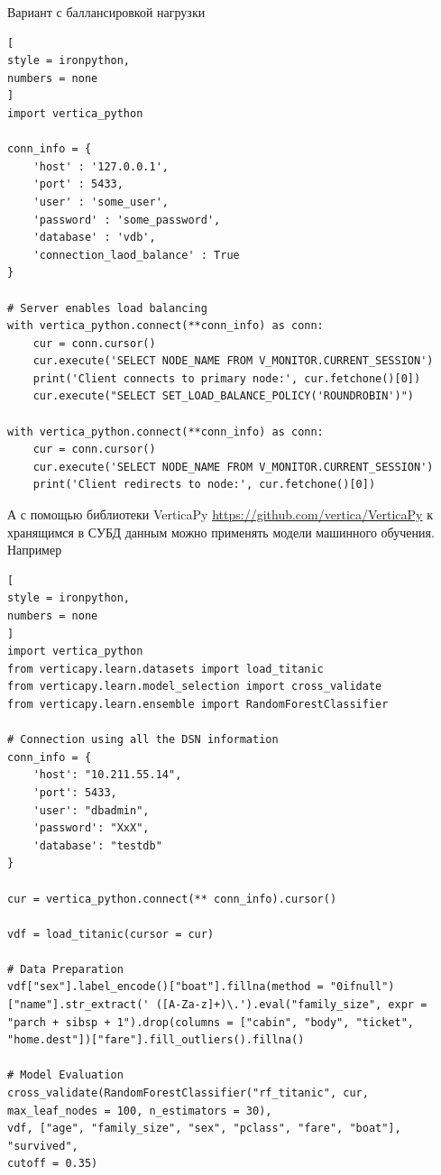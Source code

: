 \documentclass[%
	11pt,
	a4paper,
	utf8,
		]{article}
\begin{document}
Вариант с баллансировкой нагрузки
\begin{lstlisting}[
style = ironpython,
numbers = none
]
import vertica_python

conn_info = {
    'host' : '127.0.0.1',
    'port' : 5433,
    'user' : 'some_user',
    'password' : 'some_password',
    'database' : 'vdb',
    'connection_laod_balance' : True
}

# Server enables load balancing
with vertica_python.connect(**conn_info) as conn:
    cur = conn.cursor()
    cur.execute('SELECT NODE_NAME FROM V_MONITOR.CURRENT_SESSION')
    print('Client connects to primary node:', cur.fetchone()[0])
    cur.execute("SELECT SET_LOAD_BALANCE_POLICY('ROUNDROBIN')")
    
with vertica_python.connect(**conn_info) as conn:
    cur = conn.cursor()
    cur.execute('SELECT NODE_NAME FROM V_MONITOR.CURRENT_SESSION')
    print('Client redirects to node:', cur.fetchone()[0])
\end{lstlisting}

А с помощью библиотеки VerticaPy \url{https://github.com/vertica/VerticaPy} к хранящимся в СУБД данным можно применять модели машинного обучения. Например
\begin{lstlisting}[
style = ironpython,
numbers = none	
]
import vertica_python
from verticapy.learn.datasets import load_titanic
from verticapy.learn.model_selection import cross_validate
from verticapy.learn.ensemble import RandomForestClassifier

# Connection using all the DSN information
conn_info = {
	'host': "10.211.55.14", 
	'port': 5433, 
	'user': "dbadmin", 
	'password': "XxX", 
	'database': "testdb"
}

cur = vertica_python.connect(** conn_info).cursor()

vdf = load_titanic(cursor = cur)

# Data Preparation
vdf["sex"].label_encode()["boat"].fillna(method = "0ifnull")["name"].str_extract(' ([A-Za-z]+)\.').eval("family_size", expr = "parch + sibsp + 1").drop(columns = ["cabin", "body", "ticket", "home.dest"])["fare"].fill_outliers().fillna()

# Model Evaluation
cross_validate(RandomForestClassifier("rf_titanic", cur, max_leaf_nodes = 100, n_estimators = 30), 
vdf, ["age", "family_size", "sex", "pclass", "fare", "boat"], 
"survived", 
cutoff = 0.35)
\end{lstlisting}
\end{document}
